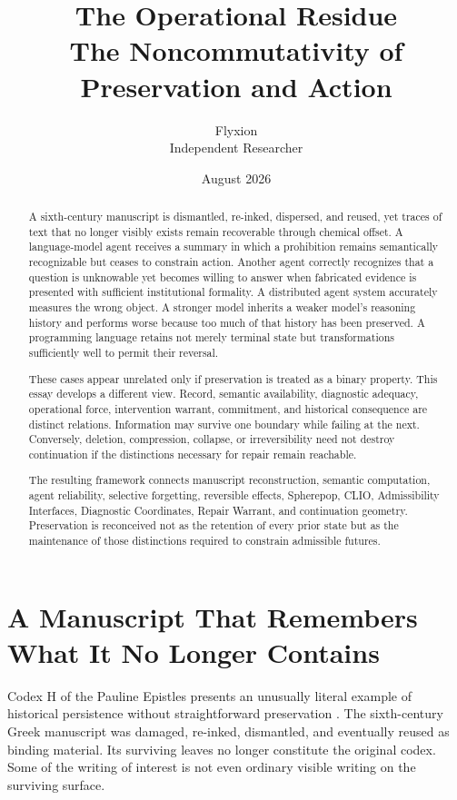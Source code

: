 \documentclass[11pt]{article}
\title{\textbf{The Operational Residue}\\
\large The Noncommutativity of Preservation and Action}
\author{Flyxion \\ Independent Researcher}
\date{August 2026}
\begin{document}
\maketitle

\begin{abstract} A sixth-century manuscript is dismantled, re-inked, dispersed, and reused, yet traces of text that no longer visibly exists remain recoverable through chemical offset. A language-model agent receives a summary in which a prohibition remains semantically recognizable but ceases to constrain action. Another agent correctly recognizes that a question is unknowable yet becomes willing to answer when fabricated evidence is presented with sufficient institutional formality. A distributed agent system accurately measures the wrong object. A stronger model inherits a weaker model's reasoning history and performs worse because too much of that history has been preserved. A programming language retains not merely terminal state but transformations sufficiently well to permit their reversal.

These cases appear unrelated only if preservation is treated as a binary property. This essay develops a different view. Record, semantic availability, diagnostic adequacy, operational force, intervention warrant, commitment, and historical consequence are distinct relations. Information may survive one boundary while failing at the next. Conversely, deletion, compression, collapse, or irreversibility need not destroy continuation if the distinctions necessary for repair remain reachable.

The resulting framework connects manuscript reconstruction, semantic computation, agent reliability, selective forgetting, reversible effects, Spherepop, CLIO, Admissibility Interfaces, Diagnostic Coordinates, Repair Warrant, and continuation geometry. Preservation is reconceived not as the retention of every prior state but as the maintenance of those distinctions required to constrain admissible futures.
\end{abstract}

\section{A Manuscript That Remembers What It No Longer Contains}

Codex H of the Pauline Epistles presents an unusually literal example of historical persistence without straightforward preservation \cite{allen2026codexh}. The sixth-century Greek manuscript was damaged, re-inked, dismantled, and eventually reused as binding material. Its surviving leaves no longer constitute the original codex. Some of the writing of interest is not even ordinary visible writing on the surviving surface.
\end{document}
